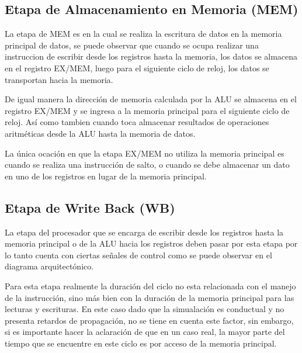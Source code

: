 \subsection{Etapa de Almacenamiento en Memoria (MEM)}
La etapa de MEM es en la cual se realiza la escritura de datos en la memoria principal de datos, se puede observar que cuando se ocupa realizar una instruccion de escribir desde los registros hasta la memoria, los datos se almacena en el registro EX/MEM, luego para el siguiente ciclo de reloj, los datos se transportan hacia la memoria. 

De igual manera la direcci\' on de memoria calculada por la ALU se almacena en el registro EX/MEM y se ingresa a la memoria principal para el siguiente ciclo de reloj. As\' i como tambien cuando toca almacenar resultados de operaciones aritm\' eticas desde la ALU hasta la memoria de datos.

La \' unica ocaci\' on en que la etapa EX/MEM no utiliza la memoria principal es cuando se realiza una instrucci\' on de salto, o cuando se debe almacenar un dato en uno de los registros en lugar de la memoria principal.




\subsection{Etapa de Write Back (WB)}
La etapa del procesador que se encarga de escribir desde los registros hasta la memoria principal o de la ALU hacia los registros deben pasar por esta etapa por lo tanto cuenta con ciertas se\~ nales de control como se puede observar en el diagrama arquitect\' onico.

Para esta etapa realmente la duraci\' on del ciclo no esta relacionada con el manejo de la instrucci\' on, sino m\' as bien con la duraci\' on de la memoria principal para las lecturas y escrituras. En este caso  dado que la simualaci\' on es conductual y no presenta retardos de propagaci\' on, no se tiene en cuenta este factor, sin embargo, si es importante hacer la aclaraci\' on de que en un caso real, la mayor parte del tiempo que se encuentre en este ciclo es por acceso de la memoria principal.


